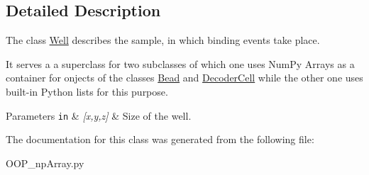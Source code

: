 \subsection{Detailed Description}
The class \mbox{\hyperlink{class_o_o_p__np_array_1_1_well}{Well}} describes the sample, in which binding events take place. 

It serves a a superclass for two subclasses of which one uses Num\+Py Arrays as a container for onjects of the classes \mbox{\hyperlink{class_o_o_p__np_array_1_1_bead}{Bead}} and \mbox{\hyperlink{class_o_o_p__np_array_1_1_decoder_cell}{Decoder\+Cell}} while the other one uses built-\/in Python lists for this purpose.


\begin{DoxyParams}[1]{Parameters}
\mbox{\tt in}  & {\em \mbox{[}x,y,z\mbox{]}} & Size of the well. \\
\hline
\end{DoxyParams}


The documentation for this class was generated from the following file\+:\begin{DoxyCompactItemize}
\item 
O\+O\+P\+\_\+np\+Array.\+py\end{DoxyCompactItemize}
